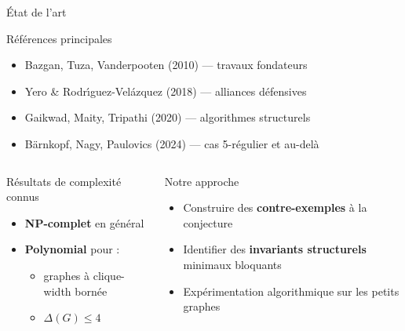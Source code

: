 \begin{frame}{\'Etat de l'art}
  \begin{block}{R\'ef\'erences principales}
    \begin{itemize}
      \item Bazgan, Tuza, Vanderpooten (2010) --- travaux fondateurs
      \item Yero \& Rodr\'{\i}guez-Vel\'azquez (2018) --- alliances d\'efensives
      \item Gaikwad, Maity, Tripathi (2020) --- algorithmes structurels
      \item B\"arnkopf, Nagy, Paulovics (2024) --- cas 5-r\'egulier et au-del\`a
    \end{itemize}
  \end{block}

  \medskip

  \begin{columns}[T]
    \begin{block}{R\'esultats de complexit\'e connus}
      \begin{itemize}
        \item \textbf{NP-complet} en g\'en\'eral
        \item \textbf{Polynomial} pour :
          \begin{itemize}
            \item graphes \`a clique-width born\'ee
            \item $\Delta(G) \leq 4$
          \end{itemize}
      \end{itemize}
    \end{block}

    \begin{exampleblock}{Notre approche}
      \begin{itemize}
        \item Construire des \textbf{contre-exemples} \`a la conjecture
        \item Identifier des \textbf{invariants structurels} minimaux bloquants
        \item Exp\'erimentation algorithmique sur les petits graphes
      \end{itemize}
    \end{exampleblock}
  \end{columns}
\end{frame}

